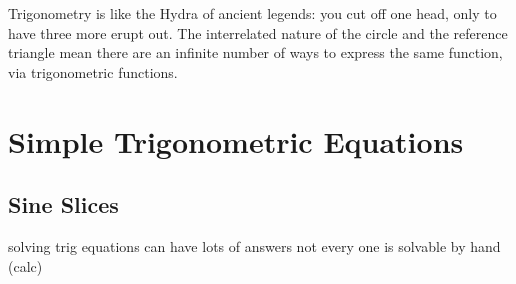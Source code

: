 

Trigonometry is like the Hydra of ancient legends: you cut off one head, only to have
three more erupt out.  The interrelated nature of the circle and the reference triangle
mean there are an infinite number of ways to express the same function, via
trigonometric functions.


\newpage
\chapterminitoc


\newpage
\section{Simple Trigonometric Equations}
\noindent{}
\subsection{Sine Slices}
solving trig equations can have lots of answers
not every one is solvable by hand (calc)

